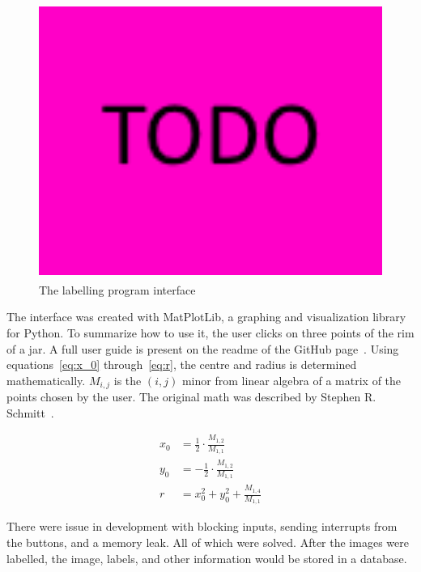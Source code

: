 \documentclass[11pt]{article}
\begin{document}
                \begin{figure}[ht]
                    \centering
                    \includegraphics[height=9cm]{images/TODO.png}
                    \caption{The labelling program interface}\label{fig:label-gui}
                \end{figure}

                The interface was created with MatPlotLib, a graphing and visualization library for Python. To summarize how to use it, the user clicks on three points of the rim of a jar. A full user guide is present on the readme of the GitHub page~\cite{akkerman_hunter}. Using equations~\ref{eq:x_0} through~\ref{eq:r}, the centre and radius is determined mathematically.  \(M_{i,j}\) is the \((i,j)\) minor from linear algebra of a matrix of the points chosen by the user. The original math was described by Stephen R. Schmitt~\cite{schmitt}.

                \begin{align}
                    x_0 &= \frac{1}{2} \cdot \frac{M_{1,2}}{M_{1,1}} \label{eq:x_0}\\
                    y_0 &= -\frac{1}{2} \cdot \frac{M_{1,2}}{M_{1,1}} \label{eq:y_0}\\
                    r   &= x_0^2 + y_0^2 + \frac{M_{1,4}}{M_{1,1}} \label{eq:r}
                \end{align}

                There were issue in development with blocking inputs, sending interrupts from the buttons, and a memory leak. All of which were solved. After the images were labelled, the image, labels, and other information would be stored in a database.
\end{document}
